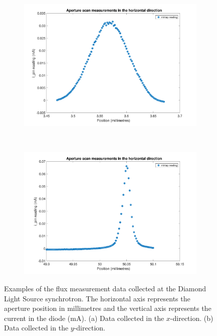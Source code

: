 \begin{figure}
        \centering
        \begin{subfigure}[b]{1.0\textwidth}
                \centering
                \includegraphics[width=\textwidth]{figures/beam/ApertureScans_x_data.pdf}
                \caption{}
                \label{fig:Original aperture measurments inx-direction - DLS}
        \end{subfigure}
				\\
        \begin{subfigure}[b]{1.0\textwidth}
                \centering
                \includegraphics[width=\textwidth]{figures/beam/ApertureScans_y_data.pdf}
                \caption{}
                \label{fig:Original aperture measurments in y-direction - DLS}
        \end{subfigure}
        \caption[Flux measurements collected using 1D aperture scans at the Diamond Light Source synchrotron.]{Examples of the flux measurement data collected at the Diamond Light Source synchrotron.
        The horizontal axis represents the aperture position in millimetres and the vertical axis represents the current in the diode (mA).
        (a) Data collected in the $x$-direction.
        (b) Data collected in the $y$-direction.}
        \label{fig:Original aperture measurments - DLS}
\end{figure}

